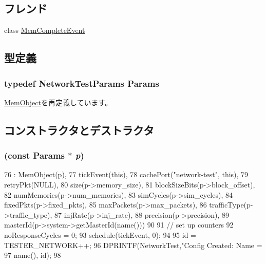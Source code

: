 \subsection*{フレンド}
\begin{DoxyCompactItemize}
\item 
class \hyperlink{classNetworkTest_a24edf30be1f143e9b680a6b2e3747fbd}{MemCompleteEvent}
\end{DoxyCompactItemize}


\subsection{型定義}
\hypertarget{classNetworkTest_aa26fd7704e843bb985048632459a664e}{
\subsubsection[{Params}]{\setlength{\rightskip}{0pt plus 5cm}typedef NetworkTestParams {\bf Params}}}
\label{classNetworkTest_aa26fd7704e843bb985048632459a664e}


\hyperlink{classMemObject_a905bbc621eeec0ed08859e21c8c95412}{MemObject}を再定義しています。

\subsection{コンストラクタとデストラクタ}
\hypertarget{classNetworkTest_af5fa4fd17ce192cb0bd275383a22b832}{
\subsubsection[{NetworkTest}]{ (const {\bf Params} $\ast$ {\em p})}}
\label{classNetworkTest_af5fa4fd17ce192cb0bd275383a22b832}



\begin{DoxyCode}
76     : MemObject(p),
77       tickEvent(this),
78       cachePort("network-test", this),
79       retryPkt(NULL),
80       size(p->memory_size),
81       blockSizeBits(p->block_offset),
82       numMemories(p->num_memories),
83       simCycles(p->sim_cycles),
84       fixedPkts(p->fixed_pkts),
85       maxPackets(p->max_packets),
86       trafficType(p->traffic_type),
87       injRate(p->inj_rate),
88       precision(p->precision),
89       masterId(p->system->getMasterId(name()))
90 {
91     // set up counters
92     noResponseCycles = 0;
93     schedule(tickEvent, 0);
94 
95     id = TESTER_NETWORK++;
96     DPRINTF(NetworkTest,"Config Created: Name = %
97             name(), id);
98 }
\end{DoxyCode}


